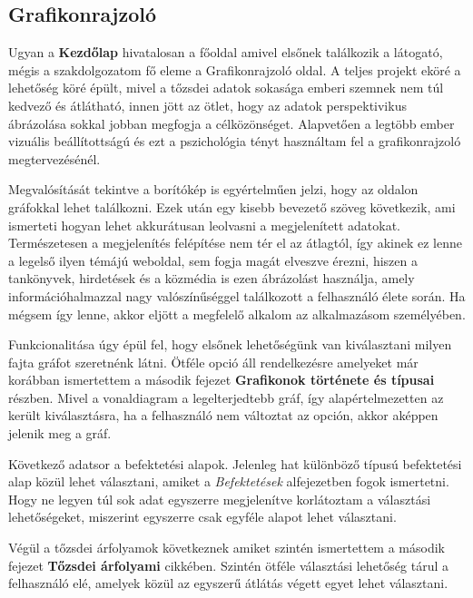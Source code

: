 \subsection{Grafikonrajzoló}

Ugyan a \textbf{Kezdőlap} hivatalosan a főoldal amivel elsőnek találkozik a látogató, mégis a szakdolgozatom fő eleme a Grafikonrajzoló oldal. A teljes projekt eköré a lehetőség köré épült, mivel a tőzsdei adatok sokasága emberi szemnek nem túl kedvező és átlátható, innen jött az ötlet, hogy az adatok perspektivikus ábrázolása sokkal jobban megfogja a célközönséget. Alapvetően a legtöbb ember vizuális beállítottságú és ezt a pszichológia tényt használtam fel a grafikonrajzoló megtervezésénél.

	Megvalósítását tekintve a borítókép is egyértelműen jelzi, hogy az oldalon gráfokkal lehet találkozni. Ezek után egy kisebb bevezető szöveg következik, ami ismerteti hogyan lehet akkurátusan leolvasni a megjelenített adatokat. Természetesen a megjelenítés felépítése nem tér el az átlagtól, így akinek ez lenne a legelső ilyen témájú weboldal, sem fogja magát elveszve érezni, hiszen a tankönyvek, hirdetések és a közmédia is ezen ábrázolást használja, amely információhalmazzal nagy valószínűséggel találkozott a felhasználó élete során. Ha mégsem így lenne, akkor eljött a megfelelő alkalom az alkalmazásom személyében.

	Funkcionalitása úgy épül fel, hogy elsőnek lehetőségünk van kiválasztani milyen fajta gráfot szeretnénk látni. Ötféle opció áll rendelkezésre amelyeket már korábban ismertettem a második fejezet \textbf{Grafikonok története és típusai} részben. Mivel a vonaldiagram a legelterjedtebb gráf, így alapértelmezetten az került kiválasztásra, ha a felhasználó nem változtat az opción, akkor aképpen jelenik meg a gráf. 

Következő adatsor a befektetési alapok. Jelenleg hat különböző típusú befektetési alap közül lehet választani, amiket a \emph{Befektetések} alfejezetben fogok ismertetni. Hogy ne legyen túl sok adat egyszerre megjelenítve korlátoztam a választási lehetőségeket, miszerint egyszerre csak egyféle alapot lehet választani. 

Végül a tőzsdei árfolyamok következnek amiket szintén ismertettem a második fejezet  \textbf{Tőzsdei árfolyami} cikkében. Szintén ötféle választási lehetőség tárul a felhasználó elé, amelyek közül az egyszerű átlátás végett egyet lehet választani.


